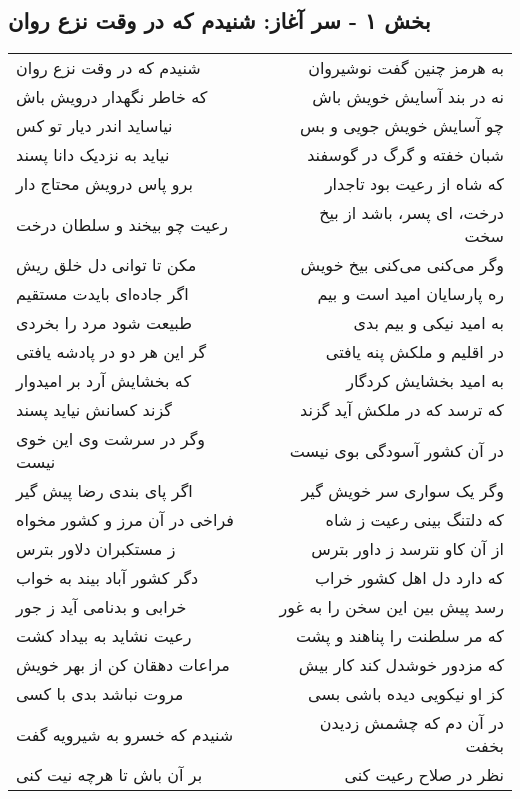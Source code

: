 \begin{center}
\section*{بخش ۱ - سر آغاز: شنیدم که در وقت نزع روان}
\label{sec:001}
\begin{longtable}{l p{0.5cm} r}
شنیدم که در وقت نزع روان
&&
به هرمز چنین گفت نوشیروان
\\
که خاطر نگهدار درویش باش
&&
نه در بند آسایش خویش باش
\\
نیاساید اندر دیار تو کس
&&
چو آسایش خویش جویی و بس
\\
نیاید به نزدیک دانا پسند
&&
شبان خفته و گرگ در گوسفند
\\
برو پاس درویش محتاج دار
&&
که شاه از رعیت بود تاجدار
\\
رعیت چو بیخند و سلطان درخت
&&
درخت، ای پسر، باشد از بیخ سخت
\\
مکن تا توانی دل خلق ریش
&&
وگر می‌کنی می‌کنی بیخ خویش
\\
اگر جاده‌ای بایدت مستقیم
&&
ره پارسایان امید است و بیم
\\
طبیعت شود مرد را بخردی
&&
به امید نیکی و بیم بدی
\\
گر این هر دو در پادشه یافتی
&&
در اقلیم و ملکش پنه یافتی
\\
که بخشایش آرد بر امیدوار
&&
به امید بخشایش کردگار
\\
گزند کسانش نیاید پسند
&&
که ترسد که در ملکش آید گزند
\\
وگر در سرشت وی این خوی نیست
&&
در آن کشور آسودگی بوی نیست
\\
اگر پای بندی رضا پیش گیر
&&
وگر یک سواری سر خویش گیر
\\
فراخی در آن مرز و کشور مخواه
&&
که دلتنگ بینی رعیت ز شاه
\\
ز مستکبران دلاور بترس
&&
از آن کاو نترسد ز داور بترس
\\
دگر کشور آباد بیند به خواب
&&
که دارد دل اهل کشور خراب
\\
خرابی و بدنامی آید ز جور
&&
رسد پیش بین این سخن را به غور
\\
رعیت نشاید به بیداد کشت
&&
که مر سلطنت را پناهند و پشت
\\
مراعات دهقان کن از بهر خویش
&&
که مزدور خوشدل کند کار بیش
\\
مروت نباشد بدی با کسی
&&
کز او نیکویی دیده باشی بسی
\\
شنیدم که خسرو به شیرویه گفت
&&
در آن دم که چشمش زدیدن بخفت
\\
بر آن باش تا هرچه نیت کنی
&&
نظر در صلاح رعیت کنی

\end{longtable}
\end{center}
